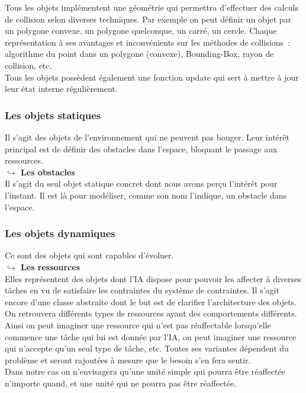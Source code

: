 Tous les objets implémentent une géométrie qui permettra d'effectuer des calculs de collision selon diverses techniques. Par exemple on peut définir un objet par un polygone convexe, un polygone quelconque, un carré, un cercle. Chaque représentation à ses avantages et inconvénients sur les méthodes de collisions~: algorithme du point dans un polygone (convexe), Bounding-Box, rayon de collision, etc.\\

Tous les objets possèdent également une fonction update qui sert à mettre à jour leur état interne régulièrement.

\subsubsection{Les objets statiques}

Il s'agit des objets de l'environnement qui ne peuvent pas bouger. Leur intérêt principal est de définir des obstacles dans l'espace, bloquant le passage aux ressources.\\

\textbf{$\hookrightarrow$ Les obstacles}\\

Il s'agit du seul objet statique concret dont nous avons perçu l’intérêt pour l'instant. Il est là pour modéliser, comme son nom l'indique, un obstacle dans l'espace.

\subsubsection{Les objets dynamiques}

Ce sont des objets qui sont capables d'évoluer.\\

\textbf{$\hookrightarrow$ Les ressources}\\

Elles représentent des objets dont l'IA dispose pour pouvoir les affecter à diverses tâches en vu de satisfaire les contraintes du système de contraintes. Il s'agit encore d'une classe abstraite dont le but est de clarifier l'architecture des objets. On retrouvera différents types de ressources ayant des comportements différents.\\

Ainsi on peut imaginer une ressource qui n'est pas réaffectable lorsqu'elle commence une tâche qui lui est donnée par l'IA, on peut imaginer une ressource qui n'accepte qu'un seul type de tâche, etc. Toutes ses variantes dépendent du problème et seront rajoutées à mesure que le besoin s'en fera sentir.\\
\indent Dans notre cas on n'envisagera qu'une unité simple qui pourra être réaffectée n'importe quand, et une unité qui ne pourra pas être réaffectée.\\\\

